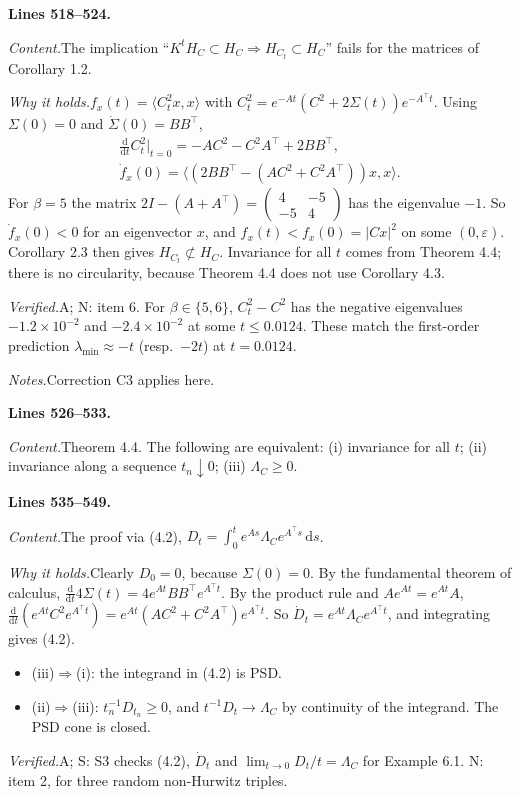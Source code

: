 \documentclass[11pt]{amsart}
\newcommand{\dd}{\,\mathrm{d}}
\newcommand{\ip}[2]{\langle #1,#2\rangle}
\newcommand{\tp}{\top}
\newcommand{\src}[1]{\par\bigskip\noindent\textbf{Lines #1.}\enspace}
\newcommand{\content}{\par\smallskip\noindent\textit{Content.}\enspace}
\newcommand{\why}{\par\smallskip\noindent\textit{Why it holds.}\enspace}
\newcommand{\verified}{\par\smallskip\noindent\textit{Verified.}\enspace}
\newcommand{\notes}{\par\smallskip\noindent\textit{Notes.}\enspace}
\newcommand{\tA}{\textsf{A}}
\newcommand{\tS}{\textsf{S}}
\newcommand{\tN}{\textsf{N}}
\begin{document}
\src{518--524}
\content The implication ``$K^tH_C\subset H_C\Rightarrow H_{C_t}\subset H_C$'' fails for the matrices of Corollary
1.2.
\why $f_x(t)=\ip{C_t^2x}x$ with $C_t^2=e^{-At}(C^2+2\Sigma(t))e^{-A^\tp t}$. Using $\Sigma(0)=0$ and
$\dot\Sigma(0)=BB^\tp$,
\begin{gather*}
\frac{\mathrm d}{\mathrm dt}C_t^2\Big|_{t=0}=-AC^2-C^2A^\tp+2BB^\tp,\\
\dot f_x(0)=\ip{(2BB^\tp-(AC^2+C^2A^\tp))x}x .
\end{gather*}
For $\beta=5$ the matrix $2I-(A+A^\tp)=\begin{pmatrix}4&-5\\-5&4\end{pmatrix}$ has the eigenvalue $-1$. So
$\dot f_x(0)<0$ for an eigenvector $x$, and $f_x(t)<f_x(0)=|Cx|^2$ on some $(0,\varepsilon)$. Corollary 2.3 then gives
$H_{C_t}\not\subset H_C$. Invariance for all $t$ comes from Theorem 4.4; there is no circularity, because Theorem 4.4
does not use Corollary 4.3.
\verified \tA; \tN: item 6. For $\beta\in\{5,6\}$, $C_t^2-C^2$ has the negative eigenvalues $-1.2\times10^{-2}$ and
$-2.4\times10^{-2}$ at some $t\le0.0124$. These match the first-order prediction $\lambda_{\min}\approx-t$ (resp.\
$-2t$) at $t=0.0124$.
\notes Correction C3 applies here.

\src{526--533}
\content Theorem 4.4. The following are equivalent: (i) invariance for all $t$; (ii) invariance along a sequence
$t_n\downarrow0$; (iii) $\Lambda_C\ge0$.

\src{535--549}
\content The proof via (4.2), $D_t=\int_0^te^{As}\Lambda_Ce^{A^\tp s}\dd s$.
\why Clearly $D_0=0$, because $\Sigma(0)=0$. By the fundamental theorem of calculus,
$\frac{\mathrm d}{\mathrm dt}4\Sigma(t)=4e^{At}BB^\tp e^{A^\tp t}$. By the product rule and $Ae^{At}=e^{At}A$,
$\frac{\mathrm d}{\mathrm dt}(e^{At}C^2e^{A^\tp t})=e^{At}(AC^2+C^2A^\tp)e^{A^\tp t}$. So
$\dot D_t=e^{At}\Lambda_Ce^{A^\tp t}$, and integrating gives (4.2).
\begin{itemize}
\item (iii)$\Rightarrow$(i): the integrand in (4.2) is PSD.
\item (ii)$\Rightarrow$(iii): $t_n^{-1}D_{t_n}\ge0$, and $t^{-1}D_t\to\Lambda_C$ by continuity of the integrand. The
PSD cone is closed.
\end{itemize}
\verified \tA; \tS: S3 checks (4.2), $\dot D_t$ and $\lim_{t\to0}D_t/t=\Lambda_C$ for Example 6.1. \tN: item 2, for
three random non-Hurwitz triples.
\end{document}
